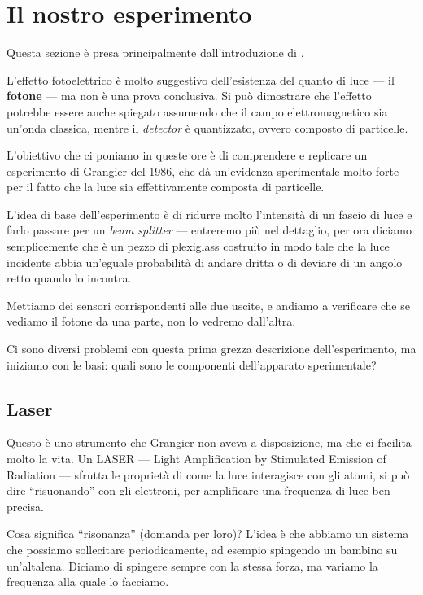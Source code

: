 \documentclass{article}
\begin{document}
\section{Il nostro esperimento}

Questa sezione è presa principalmente dall'introduzione di \textcite{thornObservingQuantumBehavior2004}.

L'effetto fotoelettrico è molto suggestivo dell'esistenza del quanto di luce --- il \textbf{fotone} --- ma non è una prova conclusiva. Si può dimostrare che l'effetto potrebbe essere anche spiegato assumendo che il campo elettromagnetico sia un'onda classica, mentre il \emph{detector} è quantizzato, ovvero composto di particelle.

L'obiettivo che ci poniamo in queste ore è di comprendere e replicare un esperimento di Grangier del 1986, che dà un'evidenza sperimentale molto forte per il fatto che la luce sia effettivamente composta di particelle.

L'idea di base dell'esperimento è di ridurre molto l'intensità di un fascio di luce e farlo passare per un \emph{beam splitter} --- entreremo più nel dettaglio, per ora diciamo semplicemente che è un pezzo di plexiglass costruito in modo tale che la luce incidente abbia un'eguale probabilità di andare dritta o di deviare di un angolo retto quando lo incontra.

Mettiamo dei sensori corrispondenti alle due uscite, e andiamo a verificare che se vediamo il fotone da una parte, non lo vedremo dall'altra.

Ci sono diversi problemi con questa prima grezza descrizione dell'esperimento, ma iniziamo con le basi: quali sono le componenti dell'apparato sperimentale?

\subsection{Laser}

Questo è uno strumento che Grangier non aveva a disposizione, ma che ci facilita molto la vita. 
Un LASER --- Light Amplification by Stimulated Emission of Radiation --- sfrutta le proprietà di come la luce interagisce con gli atomi, si può dire ``risuonando'' con gli elettroni, per amplificare una frequenza di luce ben precisa.

Cosa significa ``risonanza'' (domanda per loro)? 
L'idea è che abbiamo un sistema che possiamo sollecitare periodicamente, ad esempio spingendo un bambino su un'altalena.
Diciamo di spingere sempre con la stessa forza, ma variamo la frequenza alla quale lo facciamo.
\end{document}
